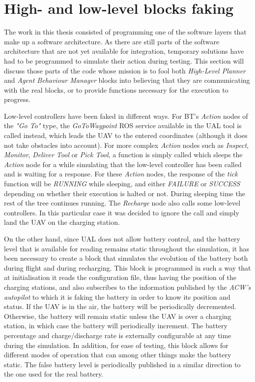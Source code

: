 \section{High- and low-level blocks faking}
\label{sec:faking}
The work in this thesis consisted of programming one of the software layers that make up a software architecture. As there are still parts of the software architecture that are not yet available for integration, temporary solutions have had to be programmed to simulate their action during testing. This section will discuss those parts of the code whose mission is to fool both \emph{High-Level Planner} and \emph{Agent Behaviour Manager} blocks into believing that they are communicating with the real blocks, or to provide functions necessary for the execution to progress.

Low-level controllers have been faked in different ways. For \gls{BT}'s \emph{Action} nodes of the \emph{"Go To"} type, the \emph{GoToWaypoint} \gls{ROS} service available in the \gls{UAL} tool is called instead, which leads the \gls{UAV} to the entered coordinates (although it does not take obstacles into account). For more complex \emph{Action} nodes such as \emph{Inspect}, \emph{Monitor}, \emph{Deliver Tool} or \emph{Pick Tool}, a function is simply called which sleeps the \emph{Action} node for a while simulating that the low-level controller has been called and is waiting for a response. For these \emph{Action} nodes, the response of the \emph{tick} function will be \emph{RUNNING} while sleeping, and either \emph{FAILURE} or \emph{SUCCESS} depending on whether their execution is halted or not. During sleeping time the rest of the tree continues running. The \emph{Recharge} node also calls some low-level controllers. In this particular case it was decided to ignore the call and simply land the \gls{UAV} on the charging station.

On the other hand, since \gls{UAL} does not allow battery control, and the battery level that is available for reading remains static throughout the simulation, it has been necessary to create a block that simulates the evolution of the battery both during flight and during recharging. This block is programmed in such a way that at initialisation it reads the configuration file, thus having the position of the charging stations, and also subscribes to the information published by the \emph{\gls{ACW}'s autopilot} to which it is faking the battery in order to know its position and status. If the \gls{UAV} is in the air, the battery will be periodically decremented. Otherwise, the battery will remain static unless the \gls{UAV} is over a charging station, in which case the battery will periodically increment. The battery percentage and charge/discharge rate is externally configurable at any time during the simulation. In addition, for ease of testing, this block allows for different modes of operation that can among other things make the battery static. The false battery level is periodically published in a similar direction to the one used for the real battery.

